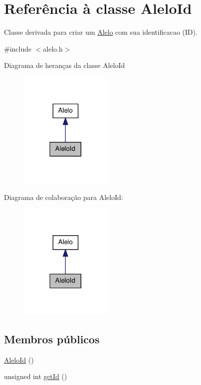 \hypertarget{class_alelo_id}{\section{\-Referência à classe \-Alelo\-Id}
\label{class_alelo_id}
}


\-Classe derivada para criar um \hyperlink{class_alelo}{\-Alelo} com sua identificacao (\-I\-D).  




{\ttfamily \#include $<$alelo.\-h$>$}



\-Diagrama de heranças da classe \-Alelo\-Id\nopagebreak
\begin{figure}[H]
\begin{center}
\leavevmode
\includegraphics[width=126pt]{class_alelo_id__inherit__graph}
\end{center}
\end{figure}


\-Diagrama de colaboração para \-Alelo\-Id\-:\nopagebreak
\begin{figure}[H]
\begin{center}
\leavevmode
\includegraphics[width=126pt]{class_alelo_id__coll__graph}
\end{center}
\end{figure}
\subsection*{\-Membros públicos}
\begin{DoxyCompactItemize}
\item 
\hyperlink{class_alelo_id_ad7a7d64a5cfd3c7bbc44d81f3d5b4380}{\-Alelo\-Id} ()
\item 
unsigned int \hyperlink{class_alelo_id_ab825afe5e781e2e072009b104d0ef4e7}{get\-Id} ()
\end{DoxyCompactItemize}


